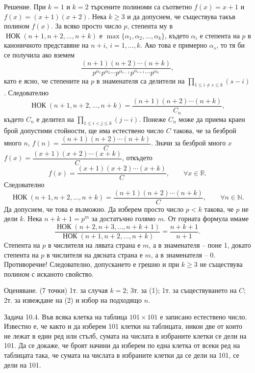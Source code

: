 Решение. При $k=1$ и $k=2$ търсените полиноми са съответно $f(x)=x+1$ и $f(x)=(x+1)(x+2)$. Нека $k\geq3$ и да допуснем, че съществува такъв полином $f(x)$. За всяко просто число $p$, степента му в $\operatorname{НОК}(n+1,n+2,\ldots,n+k)$ е $\max\{\alpha_1,\alpha_2,\ldots,\alpha_k\}$, където $\alpha_i$ е степента на $p$ в каноничното представяне на $n+i$, $i=1,\ldots,k$. Ако това е примерно $\alpha_s$, то тя би се получила ако вземем
$$
\frac{(n+1)(n+2)\cdots(n+k)}{p^{\alpha_1}p^{\alpha_2}\cdots p^{\alpha_{s-1}}p^{\alpha_{s+1}}\cdots p^{\alpha_k}},
$$
като е ясно, че степените на $p$ в знаменателя са делители на $\displaystyle\prod_{1\leq i\ne s\leq k}(s-i)$. Следователно
$$
\operatorname{НОК}(n+1,n+2,\ldots,n+k)=\frac{(n+1)(n+2)\cdots(n+k)}{C_n}, \tag{1}
$$
където $C_n$ е делител на $\displaystyle\prod_{1\leq i<j\leq k}(j-i)$. Понеже $C_n$ може да приема краен брой допустими стойности, ще има естествено число $C$ такова, че за безброй много $n$, $f(n)=\dfrac{(n+1)(n+2)\cdots(n+k)}{C}$. Значи за безброй много $x$ $f(x)=\dfrac{(x+1)(x+2)\cdots(x+k)}{C}$, откъдето
$$
f(x)=\frac{(x+1)(x+2)\cdots(x+k)}{C},\qquad \forall x\in\mathbb R.
$$
Следователно
$$
\operatorname{НОК}(n+1,n+2,\ldots,n+k)=\frac{(n+1)(n+2)\cdots(n+k)}{C},\qquad \forall n\in\mathbb N.
$$
Да допуснем, че това е възможно. Да изберем просто число $p<k$ такова, че $p$ не дели $k$. Нека $n+k+1=p^m$ за достатъчно голямо $m$. От горната формула имаме
$$
\frac{\operatorname{НОК}(n+2,n+3,\ldots,n+k+1)}{\operatorname{НОК}(n+1,n+2,\ldots,n+k)}=\frac{n+k+1}{n+1}. \tag{2}
$$
Степента на $p$ в числителя на лявата страна е $m$, а в знаменателя – поне 1, докато степента на $p$ в числителя на дясната страна е $m$, а в знаменателя – 0. Противоречие! Следователно, допускането е грешно и при $k\geq3$ не съществува полином с исканото свойство.

Оценяване. (7 точки) 1т. за случая $k=2$; 3т. за (1); 1т. за съществуването на $C$; 2т. за извеждане на (2) и избор на подходящо $n$.

Задача 10.4. Във всяка клетка на таблица $101\times101$ е записано естествено число. Известно е, че както и да изберем 101 клетки на таблицата, никои две от които не лежат в един ред или стълб, сумата на числата в избраните клетки се дели на 101. Да се докаже, че броят начини да изберем по една клетка от всеки ред на таблицата така, че сумата на числата в избраните клетки да се дели на 101, се дели на 101.

